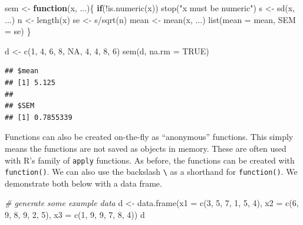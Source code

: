 \documentclass[
]{book}
\newenvironment{Shaded}{\begin{snugshade}}{\end{snugshade}}
\newcommand{\AttributeTok}[1]{\textcolor[rgb]{0.77,0.63,0.00}{#1}}
\newcommand{\CommentTok}[1]{\textcolor[rgb]{0.56,0.35,0.01}{\textit{#1}}}
\newcommand{\ConstantTok}[1]{\textcolor[rgb]{0.00,0.00,0.00}{#1}}
\newcommand{\ControlFlowTok}[1]{\textcolor[rgb]{0.13,0.29,0.53}{\textbf{#1}}}
\newcommand{\DecValTok}[1]{\textcolor[rgb]{0.00,0.00,0.81}{#1}}
\newcommand{\FunctionTok}[1]{\textcolor[rgb]{0.00,0.00,0.00}{#1}}
\newcommand{\NormalTok}[1]{#1}
\newcommand{\OtherTok}[1]{\textcolor[rgb]{0.56,0.35,0.01}{#1}}
\newcommand{\SpecialCharTok}[1]{\textcolor[rgb]{0.00,0.00,0.00}{#1}}
\newcommand{\StringTok}[1]{\textcolor[rgb]{0.31,0.60,0.02}{#1}}
\begin{document}
\begin{Shaded}
\begin{Highlighting}[]
\NormalTok{sem }\OtherTok{\textless{}{-}} \ControlFlowTok{function}\NormalTok{(x, ...)\{}
  \ControlFlowTok{if}\NormalTok{(}\SpecialCharTok{!}\FunctionTok{is.numeric}\NormalTok{(x)) }\FunctionTok{stop}\NormalTok{(}\StringTok{"x must be numeric"}\NormalTok{)}
\NormalTok{  s }\OtherTok{\textless{}{-}} \FunctionTok{sd}\NormalTok{(x, ...)}
\NormalTok{  n }\OtherTok{\textless{}{-}} \FunctionTok{length}\NormalTok{(x)}
\NormalTok{  se }\OtherTok{\textless{}{-}}\NormalTok{ s}\SpecialCharTok{/}\FunctionTok{sqrt}\NormalTok{(n)}
\NormalTok{  mean }\OtherTok{\textless{}{-}} \FunctionTok{mean}\NormalTok{(x, ...)}
  \FunctionTok{list}\NormalTok{(}\AttributeTok{mean =}\NormalTok{ mean, }\AttributeTok{SEM =}\NormalTok{ se)}
\NormalTok{\}}

\NormalTok{d }\OtherTok{\textless{}{-}} \FunctionTok{c}\NormalTok{(}\DecValTok{1}\NormalTok{, }\DecValTok{4}\NormalTok{, }\DecValTok{6}\NormalTok{, }\DecValTok{8}\NormalTok{, }\ConstantTok{NA}\NormalTok{, }\DecValTok{4}\NormalTok{, }\DecValTok{4}\NormalTok{, }\DecValTok{8}\NormalTok{, }\DecValTok{6}\NormalTok{)}
\FunctionTok{sem}\NormalTok{(d, }\AttributeTok{na.rm =} \ConstantTok{TRUE}\NormalTok{)}
\end{Highlighting}
\end{Shaded}

\begin{verbatim}
## $mean
## [1] 5.125
## 
## $SEM
## [1] 0.7855339
\end{verbatim}

Functions can also be created on-the-fly as ``anonymous'' functions. This simply means the functions are not saved as objects in memory. These are often used with R's family of \texttt{apply} functions. As before, the functions can be created with \texttt{function()}. We can also use the backslash \texttt{\textbackslash{}} as a shorthand for \texttt{function()}. We demonstrate both below with a data frame.

\begin{Shaded}
\begin{Highlighting}[]
\CommentTok{\# generate some example data}
\NormalTok{d }\OtherTok{\textless{}{-}} \FunctionTok{data.frame}\NormalTok{(}\AttributeTok{x1 =} \FunctionTok{c}\NormalTok{(}\DecValTok{3}\NormalTok{, }\DecValTok{5}\NormalTok{, }\DecValTok{7}\NormalTok{, }\DecValTok{1}\NormalTok{, }\DecValTok{5}\NormalTok{, }\DecValTok{4}\NormalTok{),}
                \AttributeTok{x2 =} \FunctionTok{c}\NormalTok{(}\DecValTok{6}\NormalTok{, }\DecValTok{9}\NormalTok{, }\DecValTok{8}\NormalTok{, }\DecValTok{9}\NormalTok{, }\DecValTok{2}\NormalTok{, }\DecValTok{5}\NormalTok{),}
                \AttributeTok{x3 =} \FunctionTok{c}\NormalTok{(}\DecValTok{1}\NormalTok{, }\DecValTok{9}\NormalTok{, }\DecValTok{9}\NormalTok{, }\DecValTok{7}\NormalTok{, }\DecValTok{8}\NormalTok{, }\DecValTok{4}\NormalTok{))}
\NormalTok{d}
\end{Highlighting}
\end{Shaded}
\end{document}
